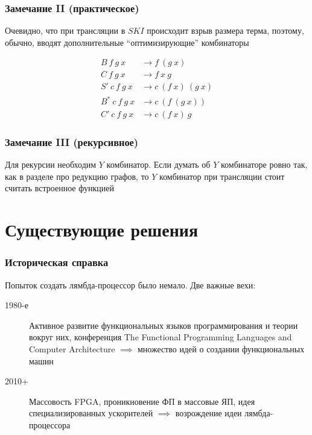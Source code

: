 \documentclass[aspectratio=169]{beamer}
\begin{document}
\begin{frame}
    \frametitle{Замечание II (практическое)}

    Очевидно, что при трансляции в $SKI$ происходит взрыв размера терма, поэтому, обычно, вводят дополнительные \enquote{оптимизирующие} комбинаторы

    \begin{align*}
        B\ f\ g\ x      & \rightarrow f\ (g\ x)         \\
        C\ f\ g\ x      & \rightarrow f\ x\ g           \\
        S'\ c\ f\ g\ x  & \rightarrow c\ (f\ x)\ (g\ x) \\
        B^*\ c\ f\ g\ x & \rightarrow c\ (f\ (g\ x))    \\
        C'\ c\ f\ g\ x  & \rightarrow c\ (f\ x)\ g
    \end{align*}

\end{frame}

\begin{frame}
    \frametitle{Замечание III (рекурсивное)}

    Для рекурсии необходим $Y$ комбинатор.
    Если думать об $Y$ комбинаторе ровно так, как в разделе про редукцию графов, то $Y$ комбинатор при трансляции стоит считать встроенное функцией

\end{frame}

\section{Существующие решения}
\begin{frame}
    \frametitle{Историческая справка}
    Попыток создать лямбда-процессор было немало.
    Две важные вехи:
    \begin{description}
        \item[1980-е] Активное развитие функциональных языков программирования и теории вокруг них, конференция The Functional Programming Languages and Computer Architecture $\implies$ множество идей о создании функциональных машин
        \item[2010+] Массовость FPGA, проникновение ФП в массовые ЯП, идея специализированных ускорителей $\implies$ возрождение идеи лямбда-процессора
    \end{description}

\end{frame}
\end{document}
